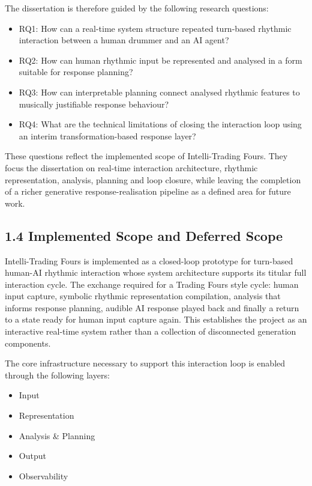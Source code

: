 The dissertation is therefore guided by the following research
questions:

\begin{itemize}
\item
  RQ1: How can a real-time system structure repeated turn-based rhythmic
  interaction between a human drummer and an AI agent?
\item
  RQ2: How can human rhythmic input be represented and analysed in a
  form suitable for response planning?
\item
  RQ3: How can interpretable planning connect analysed rhythmic features
  to musically justifiable response behaviour?
\item
  RQ4: What are the technical limitations of closing the interaction
  loop using an interim transformation-based response layer?
\end{itemize}

These questions reflect the implemented scope of Intelli-Trading Fours.
They focus the dissertation on real-time interaction architecture,
rhythmic representation, analysis, planning and loop closure, while
leaving the completion of a richer generative response-realisation
pipeline as a defined area for future work.

\subsection{1.4 Implemented Scope and Deferred
Scope}\label{implemented-scope-and-deferred-scope}

Intelli-Trading Fours is implemented as a closed-loop prototype for
turn-based human-AI rhythmic interaction whose system architecture
supports its titular full interaction cycle. The exchange required for a
Trading Fours style cycle: human input capture, symbolic rhythmic
representation compilation, analysis that informs response planning,
audible AI response played back and finally a return to a state ready
for human input capture again. This establishes the project as an
interactive real-time system rather than a collection of disconnected
generation components.

The core infrastructure necessary to support this interaction loop is
enabled through the following layers:

\begin{itemize}
\item
  Input
\item
  Representation
\item
  Analysis \& Planning
\item
  Output
\item
  Observability
\end{itemize}

